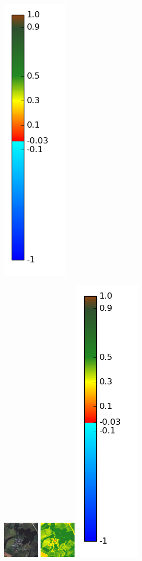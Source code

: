\documentclass{book}
\begin{document}
\begin{figure}[H]
{\includegraphics[scale=0.3]{images/colormap.png}
}
\centerline{
\includegraphics[scale=1.5]{images/Marieux/07_rgb.png}
\includegraphics[scale=1.5]{images/Marieux/07_ndvi.png}
\includegraphics[scale=0.3]{images/colormap.png}
}
\end{figure}
\end{document}
